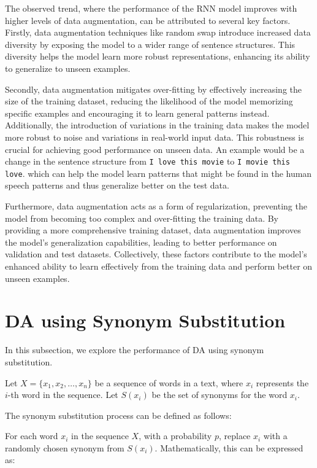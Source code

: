 \documentclass[10pt]{extarticle}
\newcommand{\code}[1]{\texttt{#1}}
\begin{document}
The observed trend, where the performance of the RNN model improves with higher
levels of data augmentation, can be attributed to several key factors. Firstly,
data augmentation techniques like random swap introduce increased data
diversity by exposing the model to a wider range of sentence structures. This
diversity helps the model learn more robust representations, enhancing its
ability to generalize to unseen examples.

Secondly, data augmentation mitigates over-fitting by effectively increasing
the size of the training dataset, reducing the likelihood of the model
memorizing specific examples and encouraging it to learn general patterns
instead. Additionally, the introduction of variations in the training data
makes the model more robust to noise and variations in real-world input data.
This robustness is crucial for achieving good performance on unseen data. An
example would be a change in the sentence structure from \code{I love this
  movie} to \code{I movie this love}. which can help the model learn patterns
that might be found in the human speech patterns and thus generalize better on
the test data.

Furthermore, data augmentation acts as a form of regularization, preventing the
model from becoming too complex and over-fitting the training data. By
providing a more comprehensive training dataset, data augmentation improves the
model's generalization capabilities, leading to better performance on
validation and test datasets. Collectively, these factors contribute to the
model's enhanced ability to learn effectively from the training data and
perform better on unseen examples.

\section{DA using Synonym Substitution}

In this subsection, we explore the performance of DA using synonym
substitution.

Let \( X = \{x_1, x_2, \ldots, x_n\} \) be a sequence of words in a text, where
\( x_i \) represents the \( i \)-th word in the sequence. Let \( S(x_i) \) be
the set of synonyms for the word \( x_i \).

The synonym substitution process can be defined as follows:

For each word \( x_i \) in the sequence \( X \), with a probability \( p \),
replace \( x_i \) with a randomly chosen synonym from \( S(x_i) \).
Mathematically, this can be expressed as:
\end{document}
